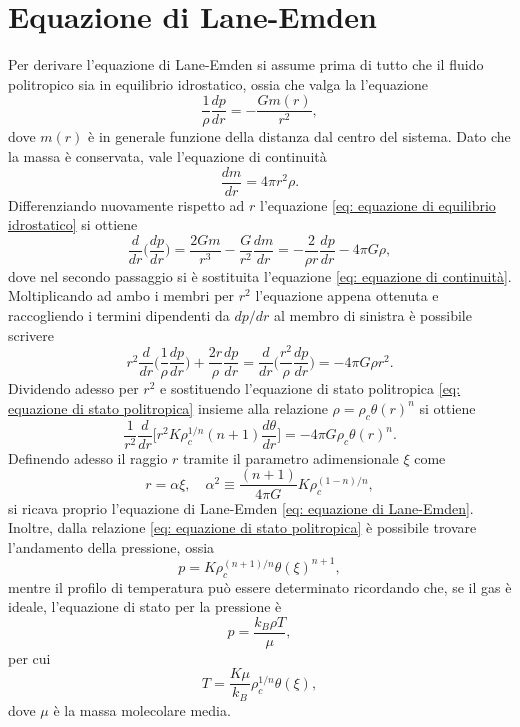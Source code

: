 \documentclass{article}
\numberwithin{equation}{section}
\begin{document}
\section{Equazione di Lane-Emden}
Per derivare l'equazione di Lane-Emden si assume prima di tutto che il fluido politropico sia in equilibrio idrostatico, ossia che valga la l'equazione 
\begin{equation}
\label{eq: equazione di equilibrio idrostatico}
    \frac{1}{\rho}\frac{dp}{dr} = -\frac{Gm(r)}{r^2},
\end{equation}
dove $m(r)$ è in generale funzione della distanza dal centro del sistema. Dato che la massa è conservata, vale l'equazione di continuità
\begin{equation}
\label{eq: equazione di continuità}
    \frac{dm}{dr} = 4\pi r^2\rho.
\end{equation}
Differenziando nuovamente rispetto ad $r$ l'equazione \eqref{eq: equazione di equilibrio idrostatico} si ottiene
\begin{equation}
    \frac{d}{dr}\bigg(\frac{dp}{dr}\bigg) = \frac{2Gm}{r^3} - \frac{G}{r^2}\frac{dm}{dr} = -\frac{2}{\rho r}\frac{dp}{dr} - 4\pi G\rho,
\end{equation}
dove nel secondo passaggio si è sostituita l'equazione \eqref{eq: equazione di continuità}. Moltiplicando ad ambo i membri per $r^2$ l'equazione appena ottenuta e raccogliendo i termini dipendenti da $dp/dr$ al membro di sinistra è possibile scrivere
\begin{equation}
    r^2\frac{d}{dr}\bigg(\frac{1}{\rho}\frac{dp}{dr}\bigg) + \frac{2r}{\rho}\frac{dp}{dr} = \frac{d}{dr}\bigg(\frac{r^2}{\rho}\frac{dp}{dr}\bigg) = -4\pi G\rho r^2.
\end{equation}
Dividendo adesso per $r^2$ e sostituendo l'equazione di stato politropica \eqref{eq: equazione di stato politropica} insieme alla relazione $\rho = \rho_c\theta(r)^n$ si ottiene
\begin{equation}
    \frac{1}{r^2}\frac{d}{dr}\bigg[r^2K\rho_c^{1/n}(n+1)\frac{d\theta}{dr}\bigg] = -4\pi G\rho_c \theta(r)^n.
\end{equation}
Definendo adesso il raggio $r$ tramite il parametro adimensionale $\xi$ come
\begin{equation}
    r = \alpha\xi,\quad \alpha^2 \equiv \frac{(n + 1)}{4\pi G}K\rho_c^{(1 - n)/n},
\end{equation} 
si ricava proprio l'equazione di Lane-Emden \eqref{eq: equazione di Lane-Emden}. Inoltre, dalla relazione \eqref{eq: equazione di stato politropica} è possibile trovare l'andamento della pressione, ossia
\begin{equation}
    p = K\rho_c^{(n+1)/n}\theta(\xi)^{n+1},
\end{equation}
mentre il profilo di temperatura può essere determinato ricordando che, se il gas è ideale, l'equazione di stato per la pressione è
\begin{equation}
    p = \frac{k_B\rho T}{\mu},
\end{equation}
per cui 
\begin{equation}
    T = \frac{K\mu}{k_B}\rho_c^{1/n}\theta(\xi),
\end{equation}
dove $\mu$ è la massa molecolare media.
\end{document}
